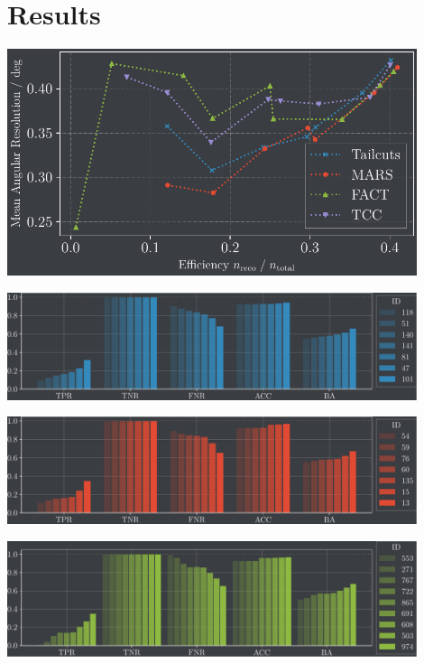 \section{Results}%
\label{sec:results}

\begin{frame}
    \centering
    \includegraphics[width=0.9\textwidth]{build/ar_vs_eff.pdf}
\end{frame}

\begin{frame}
    \centering
    \includegraphics[width=0.9\textwidth]{build/metrics_tailcuts.pdf}
\end{frame}

\begin{frame}
    \centering
    \includegraphics[width=0.9\textwidth]{build/metrics_mars.pdf}
\end{frame}

\begin{frame}
    \centering
    \includegraphics[width=0.9\textwidth]{build/metrics_fact.pdf}
\end{frame}


